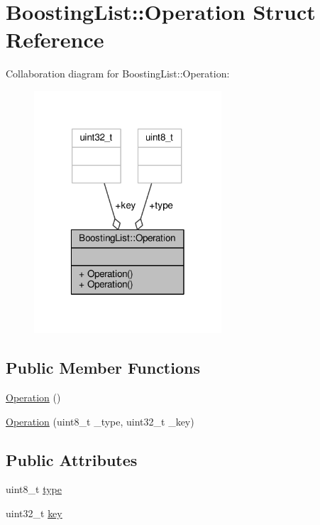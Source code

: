 \hypertarget{structBoostingList_1_1Operation}{\section{Boosting\-List\-:\-:Operation Struct Reference}
\label{structBoostingList_1_1Operation}
}


Collaboration diagram for Boosting\-List\-:\-:Operation\-:
\nopagebreak
\begin{figure}[H]
\begin{center}
\leavevmode
\includegraphics[width=198pt]{structBoostingList_1_1Operation__coll__graph}
\end{center}
\end{figure}
\subsection*{Public Member Functions}
\begin{DoxyCompactItemize}
\item 
\hyperlink{structBoostingList_1_1Operation_a0520719969f748c9a28e62f648d01281}{Operation} ()
\item 
\hyperlink{structBoostingList_1_1Operation_ad1e1b8d095bed41ea07d06e176a59fbe}{Operation} (uint8\-\_\-t \-\_\-type, uint32\-\_\-t \-\_\-key)
\end{DoxyCompactItemize}
\subsection*{Public Attributes}
\begin{DoxyCompactItemize}
\item 
uint8\-\_\-t \hyperlink{structBoostingList_1_1Operation_acd4638c8a2392627655419fc62f85822}{type}
\item 
uint32\-\_\-t \hyperlink{structBoostingList_1_1Operation_a8e20924c8bef9709d1edd3c516986372}{key}
\end{DoxyCompactItemize}


